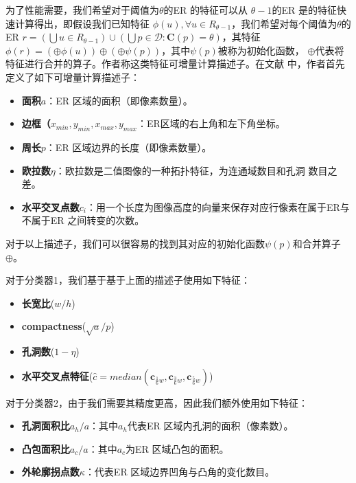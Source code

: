 为了性能需要，我们希望对于阈值为$\theta$的ER 的特征可以从
$\theta-1$的ER 是的特征快速计算得出，即假设我们已知特征 $\phi(u), \forall{u \in
  R_{\theta-1}}$，我们希望对每个阈值为$\theta$的ER $r = \left(
  \bigcup{u \in R_{\theta-1}} \right) \cup \left( \bigcup{p \in \mathcal{D}} :
  \mathbf{C}(p) = \theta \right)$，其特征$\phi(r) = \left( \oplus{\phi(u)}
\right) \oplus \left( \oplus{\psi(p)} \right)$，其中$\psi(p)$被称为初始化函数，
$\oplus$代表将特征进行合并的算子。作者称这类特征可增量计算描述子。在文献
\cite{Neumann:2012ik}中，作者首先定义了如下可增量计算描述子：

\begin{itemize}
\item \textbf{面积$a$}：ER 区域的面积（即像素数量）。
\item \textbf{边框（$x_{min}, y_{min}, x_{max}, y_{max}$}：ER区域的右上角和左下角坐标。
\item \textbf{周长$p$}：ER 区域边界的长度（即像素数量）。
\item \textbf{欧拉数$\eta$}：欧拉数是二值图像的一种拓扑特征，为连通域数目和孔洞
  数目之差。
\item \textbf{水平交叉点数$c_i$}：用一个长度为图像高度的向量来保存对应行像素在属于ER与不属于ER 之间转变的次数。
\end{itemize}

对于以上描述子，我们可以很容易的找到其对应的初始化函数$\psi(p)$和合并算子
$\oplus$。

对于分类器1，我们基于基于上面的描述子使用如下特征：

\begin{itemize}
\item \textbf{长宽比}($w/h$)
\item \textbf{compactness}($\sqrt{a}/p$)
\item \textbf{孔洞数}($1-\eta$)
\item \textbf{水平交叉点特征}($\hat{c}=median(\mathbf{c}_{\frac{1}{6}w}, \mathbf{c}_{\frac{3}{6}w}, \mathbf{c}_{\frac{5}{6}w})$)
\end{itemize}

对于分类器2，由于我们需要其精度更高，因此我们额外使用如下特征：

\begin{itemize}
\item \textbf{孔洞面积比$a_h/a$}：其中$a_h$代表ER 区域内孔洞的面积（像素数）。
\item \textbf{凸包面积比$a_c/a$}：其中$a_c$为ER 区域凸包的面积。
\item \textbf{外轮廓拐点数$\kappa$}：代表ER 区域边界凹角与凸角的变化数目。
\end{itemize}

